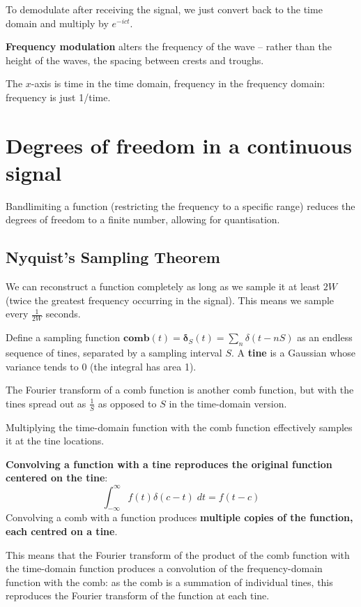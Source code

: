 \documentclass[a4paper, 11pt]{article}
\begin{document}
{{        To demodulate after receiving the signal, we just convert back to the time domain and multiply by \(e^{-ict}\).

        \textbf{Frequency modulation} alters the frequency of the wave -- rather than the height of the waves, the spacing between crests and troughs.
    }

    The \(x\)-axis is time in the time domain, frequency in the frequency domain: frequency is just 1/time.
}
\section*{Degrees of freedom in a continuous signal}
{
    Bandlimiting a function (restricting the frequency to a specific range) reduces the degrees of freedom to a finite number, allowing for quantisation.

    \subsection*{Nyquist's Sampling Theorem}
    {
        We can reconstruct a function completely as long as we sample it at least \(2W\) (twice the greatest frequency occurring in the signal). This means we sample every \(\frac{1}{2W}\) seconds.

        Define a sampling function \(\textbf{comb}(t) = \bm{\delta}_S(t) = \sum_n{\delta(t-nS)}\) as an endless sequence of tines, separated by a sampling interval \(S\). A \textbf{tine} is a Gaussian whose variance tends to 0 (the integral has area 1).

        The Fourier transform of a comb function is another comb function, but with the tines spread out as \(\frac{1}{S}\) as opposed to \(S\) in the time-domain version.

        Multiplying the time-domain function with the comb function effectively samples it at the tine locations. 

        \textbf{Convolving a function with a tine reproduces the original function centered on the tine}:
        \[\int_{-\infty}^\infty{f(t)\delta(c-t)\;dt} = f(t-c)\]
        Convolving a comb with a function produces \textbf{multiple copies of the function, each centred on a tine}.

        \begin{minipage}[t]{0.6\textwidth}
        \setlength{\parskip}{8pt}
        This means that the Fourier transform of the product of the comb function with the time-domain function produces a convolution of the frequency-domain function with the comb: as the comb is a summation of individual tines, this reproduces the Fourier transform of the function at each tine.


\end{minipage}}}
\end{document}
